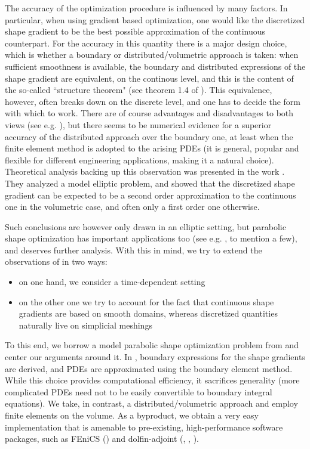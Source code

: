 \documentclass[english,a4paper,9pt,oneside]{scrbook}	%
\theoremstyle{break}
\theoremstyle{remark}
\begin{document}
The accuracy of the optimization procedure is influenced by many factors. In particular, when using gradient based optimization, one would like the discretized shape gradient to be the best possible approximation of the continuous counterpart. For the accuracy in this quantity there is a major design choice, which is whether a boundary or distributed/volumetric approach is taken: when sufficient smoothness is available, the boundary and distributed expressions of the shape gradient are equivalent, on the continous level, and this is the content of the so-called ``structure theorem" (see theorem 1.4 of \cite{avg_adj}). This equivalence, however, often breaks down on the discrete level, and one has to decide the form with which to work. There are of course advantages and disadvantages to both views (see e.g. \cite{avg_adj}), but there seems to be numerical evidence for a superior accuracy of the distributed approach over the boundary one, at least when the finite element method is adopted to the arising PDEs (it is general, popular and flexible for different engineering applications, making it a natural choice). Theoretical analysis backing up this observation was presented in the work \cite{paganini}. They analyzed a model elliptic problem, and showed that the discretized shape gradient can be expected to be a second order approximation to the continuous one in the volumetric case, and often only a first order one otherwise. 

Such conclusions are however only drawn in an elliptic setting, but parabolic shape optimization has important applications too (see e.g. \cite{lindemann2}, \cite{harbrecht} to mention a few), and deserves further analysis. With this in mind, we try to extend the observations of \cite{paganini} in two ways: 

\begin{itemize}
\item on one hand, we consider a time-dependent setting
\item on the other one we try to account for the fact that continuous shape gradients are based on smooth domains, whereas discretized quantities naturally live on simplicial meshings
\end{itemize}

To this end, we borrow a model parabolic shape optimization problem from \cite{harbrecht} and center our arguments around it. In \cite{harbrecht}, boundary expressions for the shape gradients are derived, and PDEs are approximated using the boundary element method. While this choice provides computational efficiency, it sacrifices generality (more complicated PDEs need not to be easily convertible to boundary integral equations). We take, in contrast, a distributed/volumetric approach and employ finite elements on the volume. As a byproduct, we obtain a very easy implementation that is amenable to pre-existing, high-performance software packages, such as FEniCS (\cite{fenics}) and dolfin-adjoint (\cite{dolfin-adjoint_1}, \cite{dolfin-adjoint_2}, \cite{dolfin-adjoint_3}). 
\end{document}
